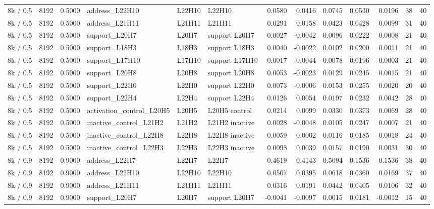 \begin{tabular}{lrrlllrrrrrrr}
8k / 0.5 & 8192 & 0.5000 & address_L22H10 & L22H10 & L22H10 & 0.0580 & 0.0416 & 0.0745 & 0.0530 & 0.0196 & 38 & 40 \\
8k / 0.5 & 8192 & 0.5000 & address_L21H11 & L21H11 & L21H11 & 0.0291 & 0.0158 & 0.0423 & 0.0428 & 0.0099 & 31 & 40 \\
8k / 0.5 & 8192 & 0.5000 & support_L20H7 & L20H7 & support L20H7 & 0.0027 & -0.0042 & 0.0096 & 0.0222 & 0.0008 & 21 & 40 \\
8k / 0.5 & 8192 & 0.5000 & support_L18H3 & L18H3 & support L18H3 & 0.0040 & -0.0022 & 0.0102 & 0.0200 & 0.0011 & 21 & 40 \\
8k / 0.5 & 8192 & 0.5000 & support_L17H10 & L17H10 & support L17H10 & 0.0017 & -0.0044 & 0.0078 & 0.0196 & 0.0003 & 21 & 40 \\
8k / 0.5 & 8192 & 0.5000 & support_L20H8 & L20H8 & support L20H8 & 0.0053 & -0.0023 & 0.0129 & 0.0245 & 0.0015 & 21 & 40 \\
8k / 0.5 & 8192 & 0.5000 & support_L22H0 & L22H0 & support L22H0 & 0.0073 & -0.0006 & 0.0153 & 0.0255 & 0.0020 & 20 & 40 \\
8k / 0.5 & 8192 & 0.5000 & support_L22H4 & L22H4 & support L22H4 & 0.0126 & 0.0054 & 0.0197 & 0.0232 & 0.0042 & 28 & 40 \\
8k / 0.5 & 8192 & 0.5000 & activation_control_L20H5 & L20H5 & L20H5 control & 0.0214 & 0.0099 & 0.0330 & 0.0373 & 0.0069 & 28 & 40 \\
8k / 0.5 & 8192 & 0.5000 & inactive_control_L21H2 & L21H2 & L21H2 inactive & 0.0028 & -0.0048 & 0.0105 & 0.0247 & 0.0007 & 21 & 40 \\
8k / 0.5 & 8192 & 0.5000 & inactive_control_L22H8 & L22H8 & L22H8 inactive & 0.0059 & 0.0002 & 0.0116 & 0.0185 & 0.0018 & 24 & 40 \\
8k / 0.5 & 8192 & 0.5000 & inactive_control_L22H3 & L22H3 & L22H3 inactive & 0.0098 & 0.0039 & 0.0157 & 0.0190 & 0.0031 & 30 & 40 \\
8k / 0.9 & 8192 & 0.9000 & address_L22H7 & L22H7 & L22H7 & 0.4619 & 0.4143 & 0.5094 & 0.1536 & 0.1536 & 38 & 40 \\
8k / 0.9 & 8192 & 0.9000 & address_L22H10 & L22H10 & L22H10 & 0.0507 & 0.0395 & 0.0618 & 0.0360 & 0.0169 & 37 & 40 \\
8k / 0.9 & 8192 & 0.9000 & address_L21H11 & L21H11 & L21H11 & 0.0316 & 0.0191 & 0.0442 & 0.0405 & 0.0106 & 32 & 40 \\
8k / 0.9 & 8192 & 0.9000 & support_L20H7 & L20H7 & support L20H7 & -0.0041 & -0.0097 & 0.0015 & 0.0181 & -0.0012 & 15 & 40 \\

\end{tabular}

